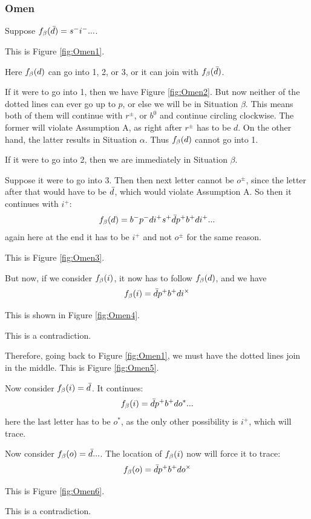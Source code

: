 \subsubsection{Omen}\label{Omen}
Suppose $f_\beta(\bar{d}) =  s^- i^-...$. 

This is Figure \ref{fig:Omen1}. 

Here $f_\beta(d)$ can go into 1, 2, or 3, or it can join with $f_\beta(\bar{d})$. 

If it were to go into 1, then we have Figure \ref{fig:Omen2}. But now neither of the dotted lines can ever go up to $p$, or else we will be in Situation $\beta$. This means both of them will continue with $r^\pm$, or $b^0$ and continue circling clockwise. The former will violate Assumption A, as right after $r^\pm$ has to be $d$. On the other hand, the latter results in Situation $\alpha$. Thus $f_\beta(d)$ cannot go into 1.

If it were to go into 2, then we are immediately in Situation $\beta$.

Suppose it were to go into 3. Then then next letter cannot be $o^\pm$, since the letter after that would have to be $\bar{d}$, which would violate Assumption A. So then it continues with $i^+$:
\[
f_\beta(d) = b^- p^- d i^+ s^+ \bar{d} p^+ b^+ d i^+...
\]
again here at the end it has to be $i^+$ and not $o^\pm$ for the same reason.

This is Figure \ref{fig:Omen3}.


But now, if we consider $f_\beta(i)$, it now has to follow $f_\beta(d)$, and we have
\[
f_\beta(i) = \bar{d} p^+ b^+ d i^\times
\]

This is shown in Figure \ref{fig:Omen4}.

This is a contradiction.

Therefore, going back to Figure \ref{fig:Omen1}, we must have the dotted lines join in the middle. This is Figure \ref{fig:Omen5}.

Now consider $f_\beta(i) = \bar{d}$. It continues:
\[
f_\beta(i) = \bar{d} p^+ b^+ d o^*...
\]
here the last letter has to be $o^*$, as the only other possibility is $i^+$, which will trace.

Now consider $f_\beta(o) = \bar{d}...$. The location of $f_\beta(i)$ now will force it to trace:
\[
f_\beta(o) = \bar{d} p^+ b^+ d o^\times
\]

This is Figure \ref{fig:Omen6}.

This is a contradiction.


